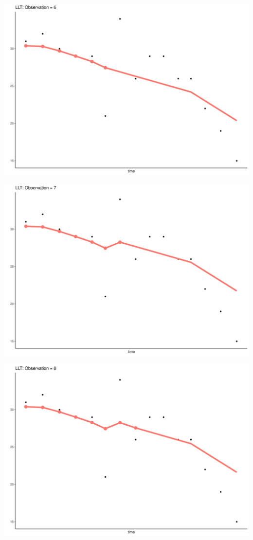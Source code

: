 \documentclass[
  ignorenonframetext,
]{beamer}
\begin{document}
\begin{frame}{}
\protect\hypertarget{section-35}{}
\includegraphics{Prez4_files/figure-beamer/unnamed-chunk-15-6.pdf}
\end{frame}

\begin{frame}{}
\protect\hypertarget{section-36}{}
\includegraphics{Prez4_files/figure-beamer/unnamed-chunk-15-7.pdf}
\end{frame}

\begin{frame}{}
\protect\hypertarget{section-37}{}
\includegraphics{Prez4_files/figure-beamer/unnamed-chunk-15-8.pdf}
\end{frame}
\end{document}
